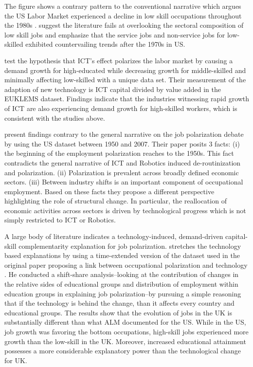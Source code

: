 \begin{onehalfspace}
The figure shows a contrary pattern to the conventional narrative
which argues the US Labor Market experienced a decline in low skill
occupations throughout the 1980s \citep{2008Autor}. \citet{2013Autor}
suggest the literature fails at overlooking the sectoral composition
of low skill jobs and emphasize that the service jobs and non-service
jobs for low-skilled exhibited countervailing trends after the 1970s
in US.

\citet{2014Michaels} test the hypothesis that ICT's effect polarizes
the labor market by causing a demand growth for high-educated while
decreasing growth for middle-skilled and minimally affecting low-skilled
with a unique data set. Their measurement of the adaption of new technology
is ICT capital divided by value added in the EUKLEMS dataset. Findings
indicate that the industries witnessing rapid growth of ICT are also
experiencing demand growth for high-skilled workers, which is consistent
with the studies above.

\citet{2018Barany} present findings contrary to the general narrative
on the job polarization debate by using the US dataset between 1950
and 2007. Their paper posits 3 facts: (i) the beginning of the employment
polarization reaches to the 1950s. This fact contradicts the general
narrative of ICT and Robotics induced de-routinization and polarization.
(ii) Polarization is prevalent across broadly defined economic sectors.
(iii) Between industry shifts is an important component of occupational
employment. Based on these facts they propose a different perspective
highlighting the role of structural change. In particular, the reallocation
of economic activities across sectors is driven by technological progress
which is not simply restricted to ICT or Robotics.

A large body of literature indicates a technology-induced, demand-driven
capital-skill complementarity explanation for job polarization. \citet{2018Salvatori}
stretches the technology based explanations by using a time-extended
version of the dataset used in the original paper proposing a link
between occupational polarization and technology \citep{2007Goos}.
He conducted a shift-share analysis--looking at the contribution
of changes in the relative sides of educational groups and distribution
of employment within education groups in explaining job polarization--by
pursuing a simple reasoning that if the technology is behind the change,
than it affects every country and educational groups. The results
show that the evolution of jobs in the UK is substantially different
than what ALM documented for the US. While in the US, job growth was
favoring the bottom occupations, high-skill jobs experienced more
growth than the low-skill in the UK. Moreover, increased educational
attainment possesses a more considerable explanatory power than the
technological change for UK.


\end{onehalfspace}
